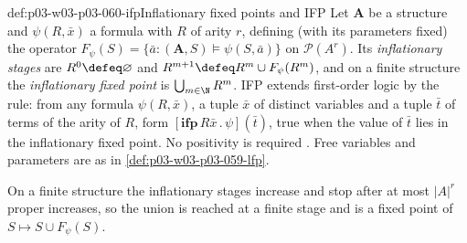 \begin{hbdefinition}{def:p03-w03-p03-060-ifp}{Inflationary fixed points and IFP}
Let \(\mathbf A\) be a structure and \(\psi(R,\bar x)\) a formula with
\(R\) of arity \(r\), defining (with its parameters fixed) the operator
\(F_\psi(S)=\{\bar a:(\mathbf A,S)\models\psi(S,\bar a)\}\) on
\(\mathcal P(A^r)\). Its \emph{inflationary stages} are
\(R^0\defeq\varnothing\) and \(R^{m+1}\defeq R^m\cup F_\psi(R^m)\), and on a
finite structure the \emph{inflationary fixed point} is
\(\bigcup_{m\in\N}R^m\). IFP extends first-order logic by the rule: from any
formula \(\psi(R,\bar x)\), a tuple \(\bar x\) of distinct variables and a
tuple \(\bar t\) of terms of the arity of \(R\), form
\([\mathbf{ifp}\,R\bar x\,.\,\psi](\bar t)\), true when the value of
\(\bar t\) lies in the inflationary fixed point. No positivity is required
\cite[Def.~3.3.45, p.~174]{Gradel2007FMTDescriptiveChapter}. Free variables
and parameters are as in \cref{def:p03-w03-p03-059-lfp}.
\end{hbdefinition}

On a finite structure the inflationary stages increase and stop after at
most \(|A|^r\) proper increases, so the union is reached at a finite stage
and is a fixed point of \(S\mapsto S\cup F_\psi(S)\).

